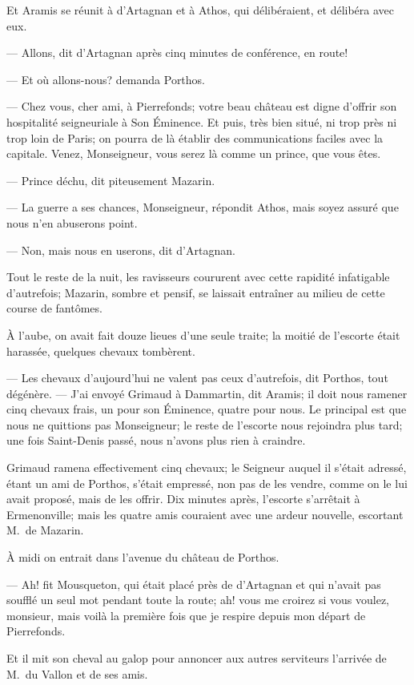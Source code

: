 Et Aramis se réunit à d'Artagnan et à Athos, qui délibéraient, et délibéra avec eux.

— Allons, dit d'Artagnan après cinq minutes de conférence, en route!

— Et où allons-nous? demanda Porthos.

— Chez vous, cher ami, à Pierrefonds; votre beau château est digne d'offrir son hospitalité seigneuriale à Son Éminence. Et puis, très bien situé, ni trop près ni trop loin de Paris; on pourra de là établir des communications faciles avec la capitale. Venez, Monseigneur, vous serez là comme un prince, que vous êtes.

— Prince déchu, dit piteusement Mazarin.

— La guerre a ses chances, Monseigneur, répondit Athos, mais soyez assuré que nous n'en abuserons point.

— Non, mais nous en userons, dit d'Artagnan.

Tout le reste de la nuit, les ravisseurs coururent avec cette rapidité infatigable d'autrefois; Mazarin, sombre et pensif, se laissait entraîner au milieu de cette course de fantômes.

À l'aube, on avait fait douze lieues d'une seule traite; la moitié de l'escorte était harassée, quelques chevaux tombèrent.

— Les chevaux d'aujourd'hui ne valent pas ceux d'autrefois, dit Porthos, tout dégénère.
— J'ai envoyé Grimaud à Dammartin, dit Aramis; il doit nous ramener cinq chevaux frais, un pour son Éminence, quatre pour nous. Le principal est que nous ne quittions pas Monseigneur; le reste de l'escorte nous rejoindra plus tard; une fois Saint-Denis passé, nous n'avons plus rien à craindre.

Grimaud ramena effectivement cinq chevaux; le Seigneur auquel il s'était adressé, étant un ami de Porthos, s'était empressé, non pas de les vendre, comme on le lui avait proposé, mais de les offrir. Dix minutes après, l'escorte s'arrêtait à Ermenonville; mais les quatre amis couraient avec une ardeur nouvelle, escortant M.~de Mazarin.

À midi on entrait dans l'avenue du château de Porthos.

— Ah! fit Mousqueton, qui était placé près de d'Artagnan et qui n'avait pas soufflé un seul mot pendant toute la route; ah! vous me croirez si vous voulez, monsieur, mais voilà la première fois que je respire depuis mon départ de Pierrefonds.

Et il mit son cheval au galop pour annoncer aux autres serviteurs l'arrivée de M.~du Vallon et de ses amis.

